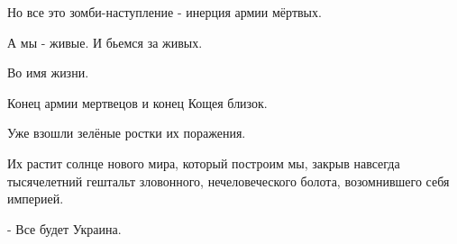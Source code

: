 Но все это зомби-наступление  - инерция армии мёртвых.

А мы - живые. И бьемся за живых.

Во имя жизни.

Конец армии мертвецов и конец Кощея близок.

Уже взошли зелёные ростки их поражения.

Их растит солнце нового мира, который построим мы, закрыв навсегда тысячелетний
гештальт зловонного, нечеловеческого болота, возомнившего себя империей. 

- Все будет Украина.

